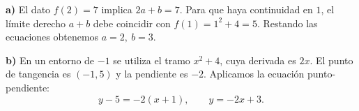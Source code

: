\textbf{a)} El dato $f(2)=7$ implica $2a+b=7$. Para que haya continuidad en $1$, el límite derecho $a+b$ debe coincidir con $f(1)=1^2+4=5$. Restando las ecuaciones obtenemos $\boxed{a=2,\ b=3}$.

\textbf{b)} En un entorno de $-1$ se utiliza el tramo $x^2+4$, cuya derivada es $2x$. El punto de tangencia es $(-1,5)$ y la pendiente es $-2$. Aplicamos la ecuación punto-pendiente:
\[
 y-5=-2(x+1),\qquad\boxed{y=-2x+3}.
\]
